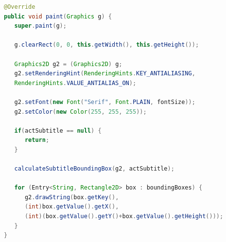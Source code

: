\begin{lstlisting}[caption=A felirat megjelenítése, language=java, label={lst:felirat_megj}]
@Override
public void paint(Graphics g) {
   super.paint(g);

   g.clearRect(0, 0, this.getWidth(), this.getHeight());

   Graphics2D g2 = (Graphics2D) g;
   g2.setRenderingHint(RenderingHints.KEY_ANTIALIASING,
   RenderingHints.VALUE_ANTIALIAS_ON);

   g2.setFont(new Font("Serif", Font.PLAIN, fontSize));
   g2.setColor(new Color(255, 255, 255));

   if(actSubtitle == null) {
      return;
   }
   
   calculateSubtitleBoundingBox(g2, actSubtitle);

   for (Entry<String, Rectangle2D> box : boundingBoxes) {
      g2.drawString(box.getKey(),
      (int)box.getValue().getX(),
      (int)(box.getValue().getY()+box.getValue().getHeight()));
   }
}
\end{lstlisting}

